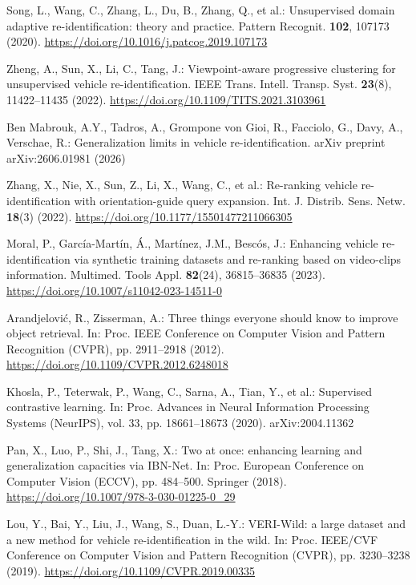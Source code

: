 Song, L., Wang, C., Zhang, L., Du, B., Zhang, Q., et al.: Unsupervised domain
adaptive re-identification: theory and practice. Pattern Recognit.
\textbf{102}, 107173 (2020). \url{https://doi.org/10.1016/j.patcog.2019.107173}

Zheng, A., Sun, X., Li, C., Tang, J.: Viewpoint-aware progressive clustering
for unsupervised vehicle re-identification. IEEE Trans. Intell. Transp. Syst.
\textbf{23}(8), 11422--11435 (2022).
\url{https://doi.org/10.1109/TITS.2021.3103961}

Ben Mabrouk, A.Y., Tadros, A., Grompone von Gioi, R., Facciolo, G., Davy, A.,
Verschae, R.: Generalization limits in vehicle re-identification. arXiv
preprint arXiv:2606.01981 (2026)

Zhang, X., Nie, X., Sun, Z., Li, X., Wang, C., et al.: Re-ranking vehicle
re-identification with orientation-guide query expansion. Int. J. Distrib.
Sens. Netw. \textbf{18}(3) (2022).
\url{https://doi.org/10.1177/15501477211066305}

Moral, P., Garc\'{i}a-Mart\'{i}n, \'{A}., Mart\'{i}nez, J.M., Besc\'{o}s, J.:
Enhancing vehicle re-identification via synthetic training datasets and
re-ranking based on video-clips information. Multimed. Tools Appl.
\textbf{82}(24), 36815--36835 (2023).
\url{https://doi.org/10.1007/s11042-023-14511-0}

Arandjelovi\'{c}, R., Zisserman, A.: Three things everyone should know to
improve object retrieval. In: Proc. IEEE Conference on Computer Vision and
Pattern Recognition (CVPR), pp. 2911--2918 (2012).
\url{https://doi.org/10.1109/CVPR.2012.6248018}

Khosla, P., Teterwak, P., Wang, C., Sarna, A., Tian, Y., et al.: Supervised
contrastive learning. In: Proc. Advances in Neural Information Processing
Systems (NeurIPS), vol. 33, pp. 18661--18673 (2020). arXiv:2004.11362

Pan, X., Luo, P., Shi, J., Tang, X.: Two at once: enhancing learning and
generalization capacities via IBN-Net. In: Proc. European Conference on
Computer Vision (ECCV), pp. 484--500. Springer (2018).
\url{https://doi.org/10.1007/978-3-030-01225-0_29}

Lou, Y., Bai, Y., Liu, J., Wang, S., Duan, L.-Y.: VERI-Wild: a large dataset
and a new method for vehicle re-identification in the wild. In: Proc. IEEE/CVF
Conference on Computer Vision and Pattern Recognition (CVPR), pp. 3230--3238
(2019). \url{https://doi.org/10.1109/CVPR.2019.00335}

